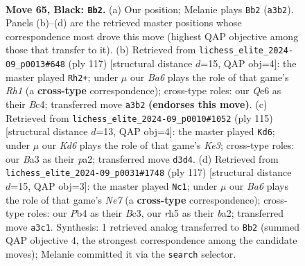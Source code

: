 \documentclass[11pt]{article}
\begin{document}
\clearpage

\begin{figure}[p]\centering
\begin{subfigure}{0.46\textwidth}\centering
\resizebox{\linewidth}{!}{%
\newchessgame
\chessboard[
  setfen={8/8/4q3/7R/1p6/b2k1BK1/8/8 b - - 21 65},
  showmover=false,
  pgfstyle=straightmove, color=movearrow, markmove={a3-b2}
]}
\caption{}
\end{subfigure}\hfill
\begin{subfigure}{0.46\textwidth}\centering
\resizebox{\linewidth}{!}{%
\newchessgame
\chessboard[
  setfen={7r/8/8/8/2bk4/8/2BK4/1R6 b - - 12 59},
  showmover=false,
  pgfstyle=straightmove, color=movearrow, markmove={h8-h2}
]}
\caption{}
\end{subfigure}
\\[4pt]
\begin{subfigure}{0.46\textwidth}\centering
\resizebox{\linewidth}{!}{%
\newchessgame
\chessboard[
  setfen={8/8/4k3/6R1/p3K3/4B3/P7/8 b - - 2 58},
  showmover=false,
  pgfstyle=straightmove, color=movearrow, markmove={e6-d6}
]}
\caption{}
\end{subfigure}\hfill
\begin{subfigure}{0.46\textwidth}\centering
\resizebox{\linewidth}{!}{%
\newchessgame
\chessboard[
  setfen={8/8/2k5/5KB1/8/2b5/Bp2n3/8 b - - 7 59},
  showmover=false,
  pgfstyle=straightmove, color=movearrow, markmove={e2-c1}
]}
\caption{}
\end{subfigure}
\caption{\textbf{Move 65, Black: \texttt{Bb2}.} (a) Our position; Melanie plays \texttt{Bb2} (\texttt{a3b2}). Panels (b)--(d) are the retrieved master positions whose correspondence most drove this move (highest QAP objective among those that transfer to it). (b) Retrieved from \texttt{lichess\_elite\_2024-09\_p0013\#648} (ply 117) [structural distance $d$=15, QAP obj=4]: the master played \texttt{Rh2+}; under $\mu$ our \emph{Ba6} plays the role of that game's \emph{Rh1} (a \textbf{cross-type} correspondence); cross-type roles: our \emph{Q}e6 as their \emph{B}c4; transferred move \texttt{a3b2} \textbf{(endorses this move)}. (c) Retrieved from \texttt{lichess\_elite\_2024-09\_p0010\#1052} (ply 115) [structural distance $d$=13, QAP obj=4]: the master played \texttt{Kd6}; under $\mu$ our \emph{Kd6} plays the role of that game's \emph{Ke3}; cross-type roles: our \emph{B}a3 as their \emph{p}a2; transferred move \texttt{d3d4}. (d) Retrieved from \texttt{lichess\_elite\_2024-09\_p0031\#1748} (ply 117) [structural distance $d$=15, QAP obj=3]: the master played \texttt{Nc1}; under $\mu$ our \emph{Ba6} plays the role of that game's \emph{Ne7} (a \textbf{cross-type} correspondence); cross-type roles: our \emph{P}b4 as their \emph{B}c3, our \emph{r}h5 as their \emph{b}a2; transferred move \texttt{a3c1}. Synthesis: 1 retrieved analog transferred to \texttt{Bb2} (summed QAP objective 4, the strongest correspondence among the candidate moves); Melanie committed it via the \texttt{search} selector.}
\label{fig:thought-m129}
\end{figure}
\end{document}
